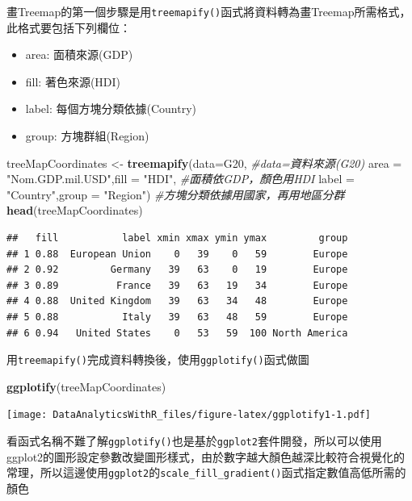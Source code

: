 \documentclass[]{book}
\newenvironment{Shaded}{\begin{snugshade}}{\end{snugshade}}
\newcommand{\KeywordTok}[1]{\textcolor[rgb]{0.13,0.29,0.53}{\textbf{{#1}}}}
\newcommand{\DataTypeTok}[1]{\textcolor[rgb]{0.13,0.29,0.53}{{#1}}}
\newcommand{\StringTok}[1]{\textcolor[rgb]{0.31,0.60,0.02}{{#1}}}
\newcommand{\CommentTok}[1]{\textcolor[rgb]{0.56,0.35,0.01}{\textit{{#1}}}}
\newcommand{\NormalTok}[1]{{#1}}
\providecommand{\tightlist}{%
  \setlength{\itemsep}{0pt}\setlength{\parskip}{0pt}}
\theoremstyle{definition}
\theoremstyle{definition}
\theoremstyle{remark}
\begin{document}
畫Treemap的第一個步驟是用\texttt{treemapify()}函式將資料轉為畫Treemap所需格式，此格式要包括下列欄位：

\begin{itemize}
\tightlist
\item
  area: 面積來源(GDP)
\item
  fill: 著色來源(HDI)
\item
  label: 每個方塊分類依據(Country)
\item
  group: 方塊群組(Region)
\end{itemize}

\begin{Shaded}
\begin{Highlighting}[]
\NormalTok{treeMapCoordinates <-}\StringTok{ }\KeywordTok{treemapify}\NormalTok{(}\DataTypeTok{data=}\NormalTok{G20, }\CommentTok{#data=資料來源(G20)}
    \DataTypeTok{area =} \StringTok{"Nom.GDP.mil.USD"}\NormalTok{,}\DataTypeTok{fill =} \StringTok{"HDI"}\NormalTok{, }\CommentTok{#面積依GDP，顏色用HDI}
    \DataTypeTok{label =} \StringTok{"Country"}\NormalTok{,}\DataTypeTok{group =} \StringTok{"Region"}\NormalTok{) }\CommentTok{#方塊分類依據用國家，再用地區分群}
\KeywordTok{head}\NormalTok{(treeMapCoordinates)}
\end{Highlighting}
\end{Shaded}

\begin{verbatim}
##   fill           label xmin xmax ymin ymax         group
## 1 0.88  European Union    0   39    0   59        Europe
## 2 0.92         Germany   39   63    0   19        Europe
## 3 0.89          France   39   63   19   34        Europe
## 4 0.88  United Kingdom   39   63   34   48        Europe
## 5 0.88           Italy   39   63   48   59        Europe
## 6 0.94   United States    0   53   59  100 North America
\end{verbatim}

用\texttt{treemapify()}完成資料轉換後，使用\texttt{ggplotify()}函式做圖

\begin{Shaded}
\begin{Highlighting}[]
\KeywordTok{ggplotify}\NormalTok{(treeMapCoordinates)}
\end{Highlighting}
\end{Shaded}

\texttt{[image: DataAnalyticsWithR\_files/figure-latex/ggplotify1-1.pdf]}

看函式名稱不難了解\texttt{ggplotify()}也是基於\texttt{ggplot2}套件開發，所以可以使用ggplot2的圖形設定參數改變圖形樣式，由於數字越大顏色越深比較符合視覺化的常理，所以這邊使用\texttt{ggplot2}的\texttt{scale\_fill\_gradient()}函式指定數值高低所需的顏色
\end{document}
